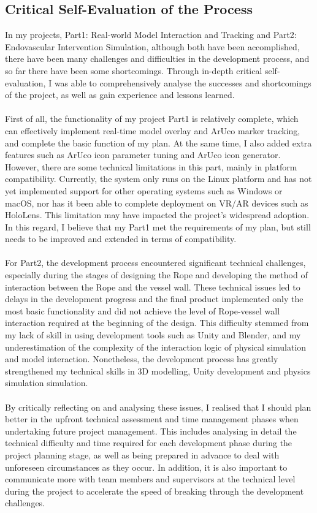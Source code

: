 \documentclass[12pt]{article}
\begin{document}
\subsection{Critical Self-Evaluation of the Process}
In my projects, Part1: Real-world Model Interaction and Tracking and Part2: Endovascular Intervention Simulation, although both have been accomplished, there have been many challenges and difficulties in the development process, and so far there have been some shortcomings. Through in-depth critical self-evaluation, I was able to comprehensively analyse the successes and shortcomings of the project, as well as gain experience and lessons learned.
\\\\
First of all, the functionality of my project Part1 is relatively complete, which can effectively implement real-time model overlay and ArUco marker tracking, and complete the basic function of my plan. At the same time, I also added extra features such as ArUco icon parameter tuning and ArUco icon generator. However, there are some technical limitations in this part, mainly in platform compatibility. Currently, the system only runs on the Linux platform and has not yet implemented support for other operating systems such as Windows or macOS, nor has it been able to complete deployment on VR/AR devices such as HoloLens. This limitation may have impacted the project's widespread adoption. In this regard, I believe that my Part1 met the requirements of my plan, but still needs to be improved and extended in terms of compatibility.
\\\\
For Part2, the development process encountered significant technical challenges, especially during the stages of designing the Rope and developing the method of interaction between the Rope and the vessel wall. These technical issues led to delays in the development progress and the final product implemented only the most basic functionality and did not achieve the level of Rope-vessel wall interaction required at the beginning of the design. This difficulty stemmed from my lack of skill in using development tools such as Unity and Blender, and my underestimation of the complexity of the interaction logic of physical simulation and model interaction. Nonetheless, the development process has greatly strengthened my technical skills in 3D modelling, Unity development and physics simulation simulation.
\\\\
By critically reflecting on and analysing these issues, I realised that I should plan better in the upfront technical assessment and time management phases when undertaking future project management. This includes analysing in detail the technical difficulty and time required for each development phase during the project planning stage, as well as being prepared in advance to deal with unforeseen circumstances as they occur. In addition, it is also important to communicate more with team members and supervisors at the technical level during the project to accelerate the speed of breaking through the development challenges.
\end{document}
